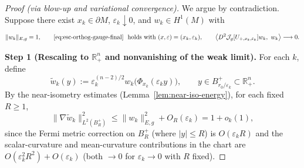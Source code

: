\documentclass[10pt,a4paper]{amsart}
\newcommand{\R}{\mathbb{R}}
\begin{document}
\begin{proof}[Proof (via blow-up and variational convergence)]
We argue by contradiction. Suppose there exist $x_k\in\partial M$, $\varepsilon_k\downarrow0$, and $w_k\in H^1(M)$ with
\begin{equation}\label{eq:contr-setup}
\|w_k\|_{E,g}=1,\qquad
\eqref{eq:esc-orthog-gauge-final}\ \text{ holds with }(x,\varepsilon)=(x_k,\varepsilon_k),
\qquad
\big\langle D^2\mathcal J_g[U_{+,x_k,\varepsilon_k}]w_k,\ w_k\big\rangle \longrightarrow 0 .
\end{equation}

\smallskip\noindent\textbf{Step 1 (Rescaling to $\R^n_+$ and nonvanishing of the weak limit).}
For each $k$, define
\[
\widetilde w_k(y)
:=\varepsilon_k^{(n-2)/2}w_k\big(\Phi_{x_k}(\varepsilon_k y)\big),
\qquad y\in B_{r_0/\varepsilon_k}^+\subset\R^n_+.
\]
By the near-isometry estimates (Lemma~\ref{lem:near-iso-energy}),
for each fixed $R\ge1$,
\begin{equation}\label{eq:per-ball-bound}
\|\nabla\widetilde w_k\|_{L^2(B_R^+)}^2
\le \|w_k\|_{E,g}^2+O_R(\varepsilon_k)=1+o_k(1),
\end{equation}
since the Fermi metric correction on $B_R^+$ (where $|y|\le R$)
is $O(\varepsilon_k R)$
and the scalar-curvature and mean-curvature contributions
in the chart are $O(\varepsilon_k^2 R^2)+O(\varepsilon_k)$
(both $\to0$ for $\varepsilon_k\to0$ with $R$ fixed).


\end{proof}
\end{document}
